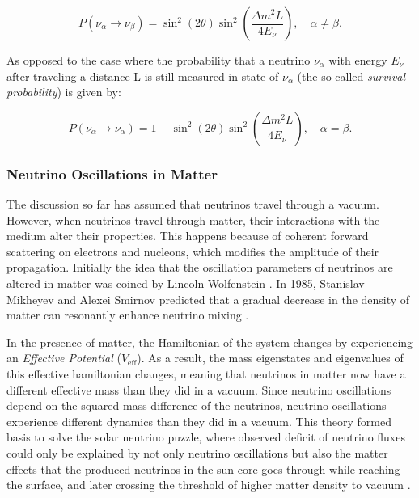 \begin{equation}\label{eq:twoflavour_transition}
P(\nu_\alpha \rightarrow \nu_\beta) = \sin^2(2\theta) \sin^2\left(\frac{\Delta m^2 L}{4 E_\nu}\right), \quad \alpha \neq \beta.
\end{equation}

As opposed to the case where the probability that a neutrino $\nu_{\alpha}$ with energy $E_{\nu}$ after traveling a distance L is still measured in state of $\nu_{\alpha}$ (the so-called \emph{survival probability}) is given by:

\begin{equation}\label{eq:twoflavour_survival}
        P(\nu_\alpha \rightarrow \nu_\alpha) = 1-\sin^2(2\theta) \sin^2\left(\frac{\Delta m^2 L}{4 E_\nu}\right), \quad \alpha = \beta.
\end{equation}

\subsubsection*{Neutrino Oscillations in Matter}
\label{sec:nu_osc_matter}
The discussion so far has assumed that neutrinos travel through a vacuum. However, when neutrinos travel through matter, their interactions with the medium alter their properties. This happens because of coherent forward scattering on electrons and nucleons, which modifies the amplitude of their propagation. Initially the idea that the oscillation parameters of neutrinos are altered in matter was coined by Lincoln Wolfenstein . In 1985, Stanislav Mikheyev and Alexei Smirnov predicted that a gradual decrease in the density of matter can resonantly enhance neutrino mixing . 

In the presence of matter, the Hamiltonian of the system changes by experiencing an \emph{Effective Potential} ($V_{\mathrm{eff}}$). As a result, the mass eigenstates and eigenvalues of  this effective hamiltonian changes, meaning that neutrinos in matter now have a different effective mass than they did in a vacuum. Since neutrino oscillations depend on the squared mass difference of the neutrinos, neutrino oscillations experience different dynamics than they did in a vacuum. This theory formed basis to solve the solar neutrino puzzle, where observed deficit of neutrino fluxes could only be explained by not only neutrino oscillations but also the matter effects that the produced neutrinos in the sun core goes through while reaching the surface, and later crossing the threshold of higher matter density to vacuum . 

